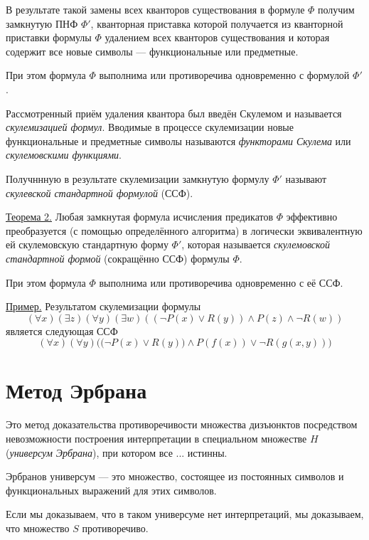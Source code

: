\documentclass{article}
\begin{document}
В результате такой замены всех кванторов существования в формуле $\Phi$ получим замкнутую ПНФ $\Phi'$, кванторная приставка которой получается из кванторной приставки формулы $\Phi$ удалением всех кванторов существования и которая содержит все новые символы --- функциональные или предметные.

При этом формула $\Phi$ выполнима или противоречива одновременно с формулой $\Phi'$.

Рассмотренный приём удаления квантора был введён Скулемом и называется {\it скулемизацией формул}. Вводимые в процессе скулемизации новые функциональные и предметные символы называются {\it функторами Скулема} или {\it скулемовскими функциями}.

Получннную в результате скулемизации замкнутую формулу $\Phi'$ называют {\it скулевской стандартной формулой} (ССФ).

\underline{Теорема 2.} Любая замкнутая формула исчисления предикатов $\Phi$ эффективно преобразуется (с помощью определённого алгоритма) в логически эквивалентную ей скулемовскую стандартную форму $\Phi'$, которая называется {\it скулемовской стандартной формой} (сокращённо ССФ) формулы $\Phi$.

При этом формула $\Phi$ выполнима или противоречива одновременно с её ССФ.

\underline{Пример.} Результатом скулемизации формулы
\begin{equation*}
    (\forall x)(\exists z)(\forall y)(\exists w)((\neg P(x) \lor R(y)) \land P(z) \land \neg R(w))
\end{equation*}
является следующая ССФ
\begin{equation*}
    (\forall x)(\forall y)\Bigg(\Big(\neg P(x) \lor R(y)\Big) \land P(f(x)) \lor \neg R(g(x, y))\Bigg)
\end{equation*}

\section{Метод Эрбрана}
Это метод доказательства противоречивости множества дизъюнктов посредством невозможности построения интерпретации в специальном множестве $H$ ({\it универсум Эрбрана}), при котором все ... истинны.

Эрбранов универсум --- это множество, состоящее из постоянных символов и функциональных выражений для этих символов.

Если мы доказываем, что в таком универсуме нет интерпретаций, мы доказываем, что множество $S$ противоречиво. \newline
\end{document}
